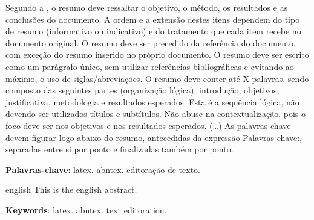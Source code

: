 \documentclass[
	10pt,				%
	oneside,			%
	a4paper,			%
	chapter=TITLE,		%
	english,			%
	brazil				%
	]{abntex2}
\begin{document}
\setlength{\absparsep}{18pt} %
\begin{resumo}
 Segundo a , o resumo deve ressaltar o
 objetivo, o método, os resultados e as conclusões do documento. A ordem e a extensão
 destes itens dependem do tipo de resumo (informativo ou indicativo) e do
 tratamento que cada item recebe no documento original. O resumo deve ser
 precedido da referência do documento, com exceção do resumo inserido no
 próprio documento. O resumo deve ser escrito como um parágrafo único, sem utilizar referências bibliográficas e evitando ao máximo, o uso de siglas/abreviações. O resumo deve conter até X palavras, sendo composto das seguintes partes (organização lógica): introdução, objetivos, justificativa, metodologia e resultados esperados. Esta é a sequência lógica, não devendo ser utilizados títulos e subtítulos. Não abuse na contextualização, pois o foco deve ser nos objetivos e nos resultados esperados. (\ldots) As palavras-chave devem figurar logo abaixo do
 resumo, antecedidas da expressão Palavras-chave:, separadas entre si por
 ponto e finalizadas também por ponto.

 \textbf{Palavras-chave}: latex. abntex. editoração de texto.
\end{resumo}

\begin{resumo}[Abstract]
 \begin{otherlanguage*}{english}
   This is the english abstract.

   \vspace{\onelineskip}
 
   \noindent 
   \textbf{Keywords}: latex. abntex. text editoration.
 \end{otherlanguage*}
\end{resumo}


\listoffigures*
\cleardoublepage
\listoftables*
\cleardoublepage

\begin{KeepFromToc}
\lstlistoflistings
\end{KeepFromToc}
\cleardoublepage
\end{document}
